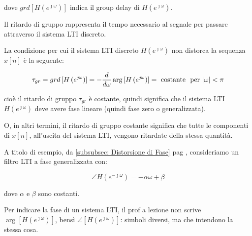 dove $grd \left[ H \left( e^{\jmath \omega}\right)\right]$ indica il group delay di $H \left( e^{\jmath \omega}\right)$. \newline 

Il ritardo di gruppo rappresenta il tempo necessario al segnale per passare attraverso il sistema LTI discreto. \newline 

La condizione per cui il sistema LTI discreto $H \left(e^{\jmath \omega}\right)$ non distorca la sequenza $x \left[ n\right]$ è la seguente: 

{
    \Large 
    \begin{equation}
        \tau_{gr} 
        = 
        grd \left[ H \left( e^{\jmath \omega}\right)\right]
        = 
        - \dfrac{d}{d \omega} \arg \left[ H \left( e^{\jmath \omega}\right)\right] 
        =
        \text{ costante }
        \text{ per }
        \abs{\omega} < \pi
    \end{equation}
}

cioè il ritardo di gruppo $\tau_{gr}$ è costante, quindi significa che il sistema LTI $H \left(e^{\jmath \omega}\right)$ 
deve avere fase lineare (quindi fase zero o generalizzata). \newline 

O, in altri termini, il ritardo di gruppo costante significa che tutte le componenti di $x \left[ n\right]$, 
all'uscita del sistema LTI, vengono ritardate della stessa quantità. \newline 

A titolo di esempio, da \ref{subsubsec: Distorsione di Fase}  pag \pageref{subsubsec: Distorsione di Fase}, 
consideriamo un filtro LTI a fase generalizzata con: 

{
    \Large 
    \begin{equation}
    \angle H \left(e^{- \jmath \omega}\right)
    = 
    - \alpha \omega + \beta      
    \end{equation}
}

dove $\alpha$ e $\beta$ sono costanti. \newline 

\begin{tcolorbox}
    Per indicare la fase di un sistema LTI, il prof a lezione non scrive $\arg \left[ H \left( e^{\jmath \omega}\right)\right]$, 
    bensì $\angle \left[ H \left( e^{\jmath \omega}\right)\right]$: simboli diversi, ma che intendono la stessa cosa.  
\end{tcolorbox}

